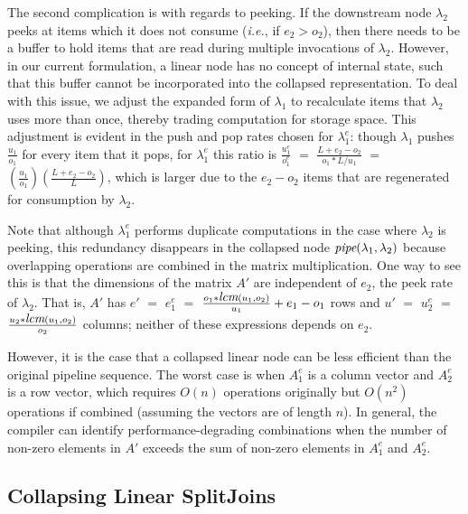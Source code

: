 The second complication is with regards to peeking.  If the downstream
node $\lambda_2$ peeks at items which it does not consume ({\it i.e.},
if $e_2 > o_2$), then there needs to be a buffer to hold items that
are read during multiple invocations of $\lambda_2$.  However, in our
current formulation, a linear node has no concept of internal state,
such that this buffer cannot be incorporated into the collapsed
representation.  To deal with this issue, we adjust the expanded form
of $\lambda_1$ to recalculate items that $\lambda_2$ uses more than
once, thereby trading computation for storage space.  This adjustment
is evident in the push and pop rates chosen for $\lambda_1^e$: though
$\lambda_1$ pushes $\frac{u_1}{o_1}$ for every item that it pops, for
$\lambda_1^e$ this ratio is $\frac{u_1^e}{o_1^e}$ $=$
$\frac{L+e_2-o_2}{o_1 * L / u_1}$ $=$
$(\frac{u_1}{o_1})(\frac{L+e_2-o_2}{L})$, which is larger due to the
$e_2-o_2$ items that are regenerated for consumption by $\lambda_2$.

Note that although $\lambda_1^e$ performs duplicate computations in
the case where $\lambda_2$ is peeking, this redundancy disappears in
the collapsed node $\mbox{\it pipe}(\lambda_1, \lambda_2)$ because
overlapping operations are combined in the matrix multiplication.  One
way to see this is that the dimensions of the matrix $A'$ are
independent of $e_2$, the peek rate of $\lambda_2$.  That is, $A'$ has
$e'$ $=$ $e_1^e$ $=$ $\frac{o_1*\mbox{\it lcm}(u_1, o_2)}{u_1}+e_1-o_1$ rows
and $u'$ $=$ $u_2^e$ $=$ $\frac{u_2 * \mbox{\it lcm}(u_1, o_2)}{o_2}$
columns; neither of these expressions depends on $e_2$.

However, it is the case that a collapsed linear node can be less
efficient than the original pipeline sequence.  The worst case is when
$A_1^e$ is a column vector and $A_2^e$ is a row vector, which requires
$O(n)$ operations originally but $O(n^2)$ operations if combined
(assuming the vectors are of length $n$).  In general, the compiler
can identify performance-degrading combinations when the number of
non-zero elements in $A'$ exceeds the sum of non-zero elements in
$A_1^e$ and $A_2^e$.

\subsection{Collapsing Linear SplitJoins}

